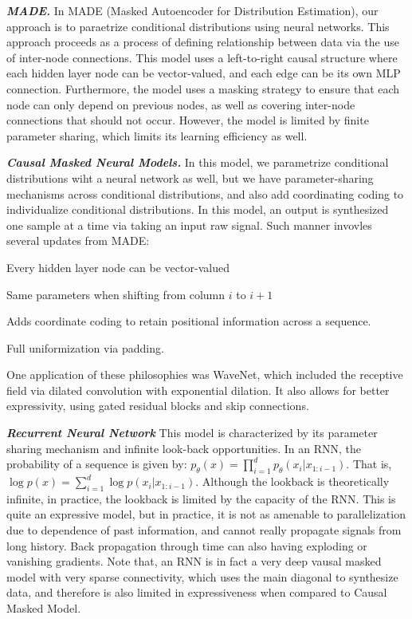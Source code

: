 \textbf{\textit{MADE.}}
In MADE (Masked Autoencoder for Distribution Estimation), our approach is to paraetrize conditional distributions using neural networks.
This approach proceeds as a process of defining relationship between data via the use of inter-node connections.
This model uses a left-to-right causal structure where each hidden layer node can be vector-valued, and each edge can be its own MLP connection.
Furthermore, the model uses a masking strategy to ensure that each node can only depend on previous nodes, as well as covering inter-node connections that should not occur.
However, the model is limited by finite parameter sharing, which limits its learning efficiency as well.

\textbf{\textit{Causal Masked Neural Models.}}
In this model, we parametrize conditional distributions wiht a neural network as well, but we have parameter-sharing mechanisms across conditional distributions, and also add coordinating coding to individualize conditional distributions.
In this model, an output is synthesized one sample at a time via taking an input raw signal.
Such manner invovles several updates from MADE:
\begin{bindenum}
    \item Every hidden layer node can be vector-valued
    \item Same parameters when shifting from column $i$ to $i + 1$
    \item Adds coordinate coding to retain positional information across a sequence.
    \item Full uniformization via padding.
\end{bindenum}
One application of these philosophies was WaveNet, which included the receptive field via dilated convolution with exponential dilation.
It also allows for better expressivity, using gated residual blocks and skip connections.

\textbf{\textit{Recurrent Neural Network}}
This model is characterized by its parameter sharing mechanism and infinite look-back opportunities.
In an RNN, the probability of a sequence is given by: $p_\theta (x) = \prod_{i=1}^d p_\theta (x_i | x_{1:i-1})$.
That is, $\log p(x) = \sum_{i=1}^d \log p(x_i | x_{1:i-1})$.
Although the lookback is theoretically infinite, in practice, the lookback is limited by the capacity of the RNN.
This is quite an expressive model, but in practice, it is not as amenable to parallelization due to dependence of past information, and cannot really propagate signals from long history.
Back propagation through time can also having exploding or vanishing gradients.
Note that, an RNN is in fact a very deep vausal masked model with very sparse connectivity, which uses the main diagonal to synthesize data, and therefore is also limited in expressiveness when compared to Causal Masked Model.

